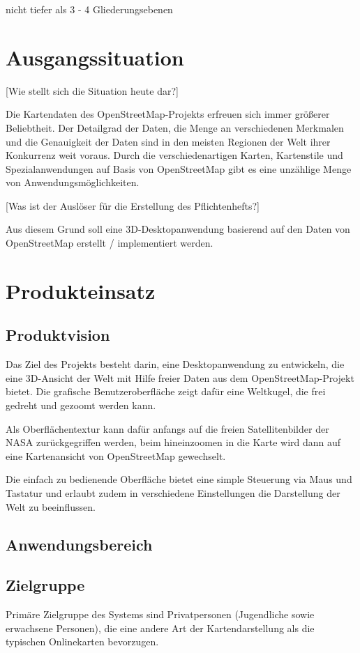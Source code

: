 \documentclass[10pt]{report}
\begin{document}
\tableofcontents

nicht tiefer als 3 - 4 Gliederungsebenen

\chapter{Ausgangssituation}
[Wie stellt sich die Situation heute dar?]

Die Kartendaten des OpenStreetMap-Projekts erfreuen sich immer größerer Beliebtheit. Der Detailgrad der Daten, die Menge an verschiedenen Merkmalen und die Genauigkeit der Daten sind in den meisten Regionen der Welt ihrer Konkurrenz weit voraus. Durch die verschiedenartigen Karten, Kartenstile und Spezialanwendungen auf Basis von OpenStreetMap gibt es eine unzählige Menge von Anwendungsmöglichkeiten.


[Was ist der Auslöser für die Erstellung des Pflichtenhefts?]

Aus diesem Grund soll eine 3D-Desktopanwendung basierend auf den Daten von OpenStreetMap erstellt / implementiert werden.


\chapter{Produkteinsatz}
\section{Produktvision}
Das Ziel des Projekts besteht darin, eine Desktopanwendung zu entwickeln, die eine 3D-Ansicht der Welt mit Hilfe freier Daten aus dem OpenStreetMap-Projekt bietet. Die grafische Benutzeroberﬂäche zeigt dafür eine Weltkugel, die frei gedreht und gezoomt werden kann. 

Als Oberﬂächentextur kann dafür anfangs auf die freien Satellitenbilder der
NASA zurückgegriﬀen werden, beim hineinzoomen in die Karte wird dann auf eine Kartenansicht von OpenStreetMap gewechselt.

Die einfach zu bedienende Oberﬂäche bietet eine simple Steuerung via Maus und Tastatur und erlaubt zudem in verschiedene Einstellungen die Darstellung der Welt zu beeinﬂussen. 


\section{Anwendungsbereich}



\section{Zielgruppe}
Primäre Zielgruppe des Systems sind Privatpersonen (Jugendliche sowie erwachsene Personen), die eine andere Art der Kartendarstellung als die typischen Onlinekarten bevorzugen.
\end{document}
